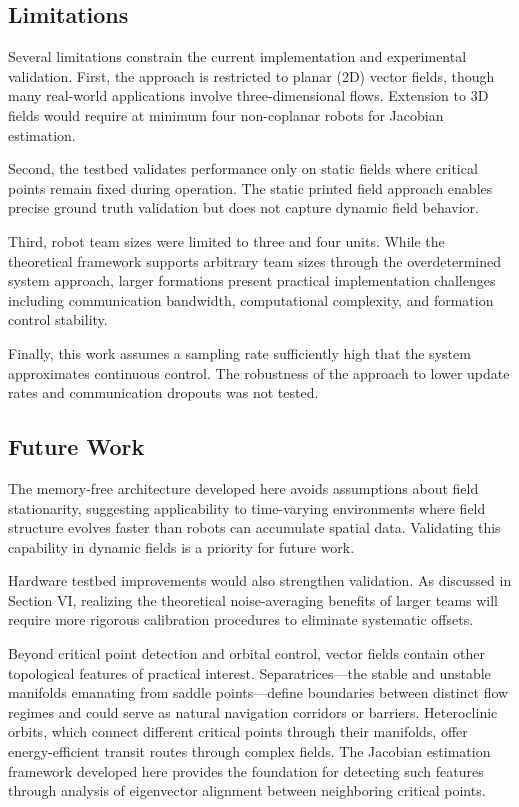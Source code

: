 \documentclass[lettersize,journal]{IEEEtran}
\begin{document}
\subsection{Limitations}

Several limitations constrain the current implementation and experimental validation. First, the approach is restricted to planar (2D) vector fields, though many real-world applications involve three-dimensional flows. Extension to 3D fields would require at minimum four non-coplanar robots for Jacobian estimation.

Second, the testbed validates performance only on static fields where critical points remain fixed during operation. The static printed field approach enables precise ground truth validation but does not capture dynamic field behavior.

Third, robot team sizes were limited to three and four units. While the theoretical framework supports arbitrary team sizes through the overdetermined system approach, larger formations present practical implementation challenges including communication bandwidth, computational complexity, and formation control stability.

Finally, this work assumes a sampling rate sufficiently high that the system approximates continuous control. The robustness of the approach to lower update rates and communication dropouts was not tested.

\subsection{Future Work}

The memory-free architecture developed here avoids assumptions about field stationarity, suggesting applicability to time-varying environments where field structure evolves faster than robots can accumulate spatial data. Validating this capability in dynamic fields is a priority for future work.

Hardware testbed improvements would also strengthen validation. As discussed in Section VI, realizing the theoretical noise-averaging benefits of larger teams will require more rigorous calibration procedures to eliminate systematic offsets.

Beyond critical point detection and orbital control, vector fields contain other topological features of practical interest. Separatrices—the stable and unstable manifolds emanating from saddle points—define boundaries between distinct flow regimes and could serve as natural navigation corridors or barriers. Heteroclinic orbits, which connect different critical points through their manifolds, offer energy-efficient transit routes through complex fields. The Jacobian estimation framework developed here provides the foundation for detecting such features through analysis of eigenvector alignment between neighboring critical points.
\end{document}
